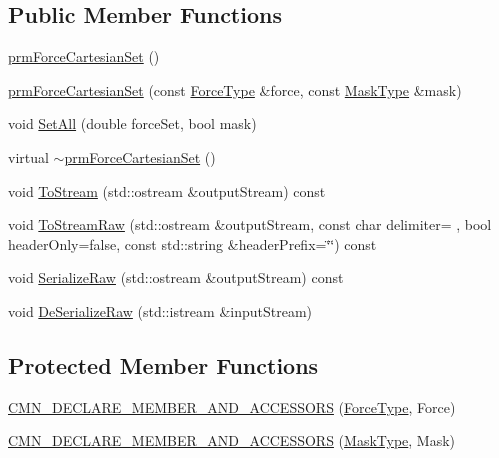\subsection*{Public Member Functions}
\begin{DoxyCompactItemize}
\item 
\hyperlink{classprm_force_cartesian_set_a0365087de929b46d3f79bbd55491731c}{prm\+Force\+Cartesian\+Set} ()
\item 
\hyperlink{classprm_force_cartesian_set_a456fabc5cecaa75cda0934696d57831d}{prm\+Force\+Cartesian\+Set} (const \hyperlink{classprm_force_cartesian_set_aef7a9a5a3ce601f7d1f1c752ddb36c00}{Force\+Type} \&force, const \hyperlink{classprm_force_cartesian_set_abcc1516523be27cf3b572d0d1c463db9}{Mask\+Type} \&mask)
\item 
void \hyperlink{classprm_force_cartesian_set_a38537175a3cf47a82f9b74826605c0c2}{Set\+All} (double force\+Set, bool mask)
\item 
virtual \hyperlink{classprm_force_cartesian_set_ac1544bc3e945811b2406f34df9a8d084}{$\sim$prm\+Force\+Cartesian\+Set} ()
\item 
void \hyperlink{classprm_force_cartesian_set_a78ba6df453036e7cc2490be6bcc9bf7f}{To\+Stream} (std\+::ostream \&output\+Stream) const 
\item 
void \hyperlink{classprm_force_cartesian_set_a5cddf5bcd6c9663b7e435c4b9bddf1af}{To\+Stream\+Raw} (std\+::ostream \&output\+Stream, const char delimiter= \textquotesingle{} \textquotesingle{}, bool header\+Only=false, const std\+::string \&header\+Prefix=\char`\"{}\char`\"{}) const 
\item 
void \hyperlink{classprm_force_cartesian_set_a5a62aa3833314ee1df02d8e85b32fa1e}{Serialize\+Raw} (std\+::ostream \&output\+Stream) const 
\item 
void \hyperlink{classprm_force_cartesian_set_afed6acd5be75fc38cfee9000a52b6209}{De\+Serialize\+Raw} (std\+::istream \&input\+Stream)
\end{DoxyCompactItemize}
\subsection*{Protected Member Functions}
\begin{DoxyCompactItemize}
\item 
\hyperlink{classprm_force_cartesian_set_a7b1376e3debee0dc4e290eeda1836abc}{C\+M\+N\+\_\+\+D\+E\+C\+L\+A\+R\+E\+\_\+\+M\+E\+M\+B\+E\+R\+\_\+\+A\+N\+D\+\_\+\+A\+C\+C\+E\+S\+S\+O\+R\+S} (\hyperlink{classprm_force_cartesian_set_aef7a9a5a3ce601f7d1f1c752ddb36c00}{Force\+Type}, Force)
\item 
\hyperlink{classprm_force_cartesian_set_a3cb88ba29555b4ff1839a2ddf0933809}{C\+M\+N\+\_\+\+D\+E\+C\+L\+A\+R\+E\+\_\+\+M\+E\+M\+B\+E\+R\+\_\+\+A\+N\+D\+\_\+\+A\+C\+C\+E\+S\+S\+O\+R\+S} (\hyperlink{classprm_force_cartesian_set_abcc1516523be27cf3b572d0d1c463db9}{Mask\+Type}, Mask)
\end{DoxyCompactItemize}


